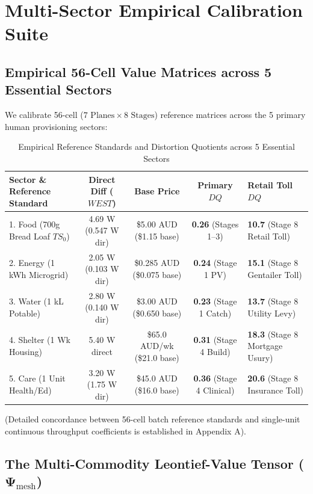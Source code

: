 \documentclass[preprint,12pt,authoryear]{elsarticle}
\theoremstyle{definition}
\begin{document}
\section{Multi-Sector Empirical Calibration Suite}

\subsection{Empirical 56-Cell Value Matrices across 5 Essential Sectors}

We calibrate 56-cell ($7\text{ Planes} \times 8\text{ Stages}$) reference matrices across the 5 primary human provisioning sectors:

  
  

\begin{table}[htbp]
\centering
\small
\caption{Empirical Reference Standards and Distortion Quotients across 5 Essential Sectors}
\label{tab:matrix_2}
\begin{tabularx}{\textwidth}{l c c c p{3.8cm}}
\toprule
\textbf{Sector \& Reference Standard} & \textbf{Direct Diff ($WEST$)} & \textbf{Base Price} & \textbf{Primary $DQ$} & \textbf{Retail Toll $DQ$} \\
\midrule
1. Food (700g Bread Loaf $TS_0$) & 4.69 W (0.547 W dir) & \$5.00 AUD (\$1.15 base) & \textbf{0.26} (Stages 1--3) & \textbf{10.7} (Stage 8 Retail Toll) \\
2. Energy (1 kWh Microgrid) & 2.05 W (0.103 W dir) & \$0.285 AUD (\$0.075 base) & \textbf{0.24} (Stage 1 PV) & \textbf{15.1} (Stage 8 Gentailer Toll) \\
3. Water (1 kL Potable) & 2.80 W (0.140 W dir) & \$3.00 AUD (\$0.650 base) & \textbf{0.23} (Stage 1 Catch) & \textbf{13.7} (Stage 8 Utility Levy) \\
4. Shelter (1 Wk Housing) & 5.40 W direct & \$65.0 AUD/wk (\$21.0 base) & \textbf{0.31} (Stage 4 Build) & \textbf{18.3} (Stage 8 Mortgage Usury) \\
5. Care (1 Unit Health/Ed) & 3.20 W (1.75 W dir) & \$45.0 AUD (\$16.0 base) & \textbf{0.36} (Stage 4 Clinical) & \textbf{20.6} (Stage 8 Insurance Toll) \\
\bottomrule
\end{tabularx}
\end{table}

(Detailed concordance between 56-cell batch reference standards and single-unit continuous throughput coefficients is established in Appendix A).

\subsection{The Multi-Commodity Leontief-Value Tensor ($\mathbf{\Psi}_{\text{mesh}}$)}
\end{document}
